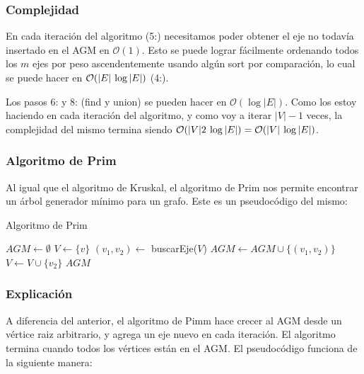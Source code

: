 \subsubsection*{Complejidad}

En cada iteraci\'on del algoritmo (5:) necesitamos poder obtener el eje no todav\'ia insertado en el AGM en $\mathcal{O}(1)$. Esto se puede lograr f\'acilmente ordenando todos los $m$ ejes por peso ascendentemente usando alg\'un sort por comparaci\'on, lo cual se puede hacer en $\mathcal{O}(|E| \hspace{2px}\log{}|E|)$ (4:).

Los pasos 6: y 8: (find y union) se pueden hacer en $\mathcal{O}(\log{} |E|)$. Como los estoy haciendo en cada iteraci\'on del algoritmo, y como voy a iterar $|V|-1$ veces, la complejidad del mismo termina siendo $\mathcal{O}(|V| 2 \hspace{2px}\log{}|E|) = \mathcal{O}(|V| \hspace{2px}\log{}|E|)$.

\newpage
\subsubsection{Algoritmo de Prim}

Al igual que el algoritmo de Kruskal, el algoritmo de Prim nos permite encontrar un \'arbol generador m\'inimo para un grafo. Este es un pseudoc\'odigo del mismo:

\begin{algorithm}
\caption{Algoritmo de Prim}
\begin{algorithmic}[1]
\State $AGM \gets \emptyset$
\State $V \gets \{ v \}$
  \State $(v_1, v_2) \gets$ buscarEje($V$)
  \State $AGM \gets AGM \cup \{ (v_1, v_2) \}$
  \State $V \gets V \cup \{ v_2 \}$
\EndWhile
\Return $AGM$
\end{algorithmic}
\end{algorithm}

\subsubsection*{Explicaci\'on}

A diferencia del anterior, el algoritmo de Pimm hace crecer al AGM desde un v\'ertice raiz arbitrario, y agrega un eje nuevo en cada iteraci\'on. El algoritmo termina cuando todos los v\'ertices est\'an en el AGM. El pseudoc\'odigo funciona de la siguiente manera:

